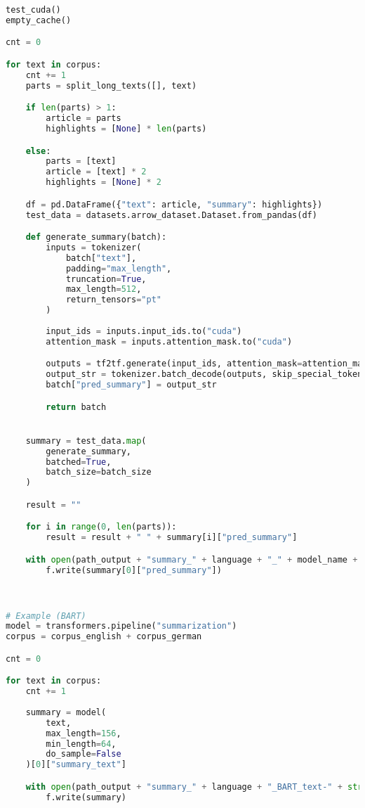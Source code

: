 \begin{lstlisting}[language=Python, caption=Beispielcode]
test_cuda()
empty_cache()

cnt = 0

for text in corpus:
    cnt += 1
    parts = split_long_texts([], text)

    if len(parts) > 1:
        article = parts
        highlights = [None] * len(parts)

    else:
        parts = [text]
        article = [text] * 2
        highlights = [None] * 2

    df = pd.DataFrame({"text": article, "summary": highlights})
    test_data = datasets.arrow_dataset.Dataset.from_pandas(df)

    def generate_summary(batch):
        inputs = tokenizer(
            batch["text"],
            padding="max_length",
            truncation=True,
            max_length=512,
            return_tensors="pt"
        )
        
        input_ids = inputs.input_ids.to("cuda")
        attention_mask = inputs.attention_mask.to("cuda")

        outputs = tf2tf.generate(input_ids, attention_mask=attention_mask)
        output_str = tokenizer.batch_decode(outputs, skip_special_tokens=True)
        batch["pred_summary"] = output_str

        return batch


    summary = test_data.map(
        generate_summary,
        batched=True,
        batch_size=batch_size
    )

    result = ""

    for i in range(0, len(parts)):
        result = result + " " + summary[i]["pred_summary"]

    with open(path_output + "summary_" + language + "_" + model_name + "_text-" + str(cnt) + ".txt", "w", encoding="utf-8") as f:
        f.write(summary[0]["pred_summary"])



# Example (BART)
model = transformers.pipeline("summarization")
corpus = corpus_english + corpus_german

cnt = 0

for text in corpus:
    cnt += 1
    
    summary = model(
        text,
        max_length=156,
        min_length=64,
        do_sample=False
    )[0]["summary_text"]

    with open(path_output + "summary_" + language + "_BART_text-" + str(cnt) + ".txt", "w", encoding="utf-8") as f:
        f.write(summary)
\end{lstlisting}
